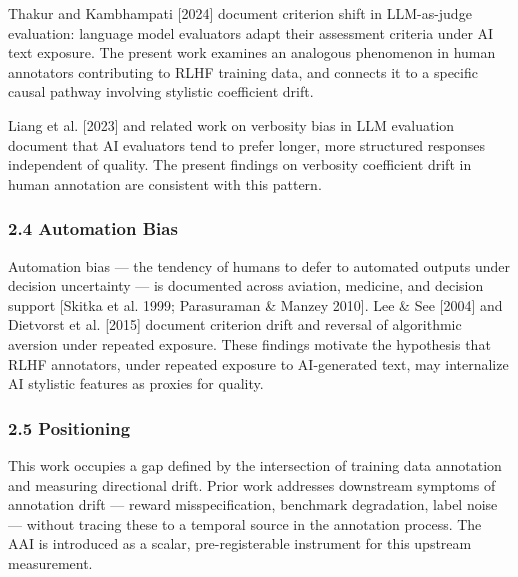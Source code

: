 Thakur and Kambhampati [2024] document criterion shift in LLM-as-judge evaluation: language model evaluators adapt their assessment criteria under AI text exposure. The present work examines an analogous phenomenon in human annotators contributing to RLHF training data, and connects it to a specific causal pathway involving stylistic coefficient drift.

Liang et al. [2023] and related work on verbosity bias in LLM evaluation document that AI evaluators tend to prefer longer, more structured responses independent of quality. The present findings on verbosity coefficient drift in human annotation are consistent with this pattern.

\subsubsection{2.4 Automation Bias}

Automation bias — the tendency of humans to defer to automated outputs under decision uncertainty — is documented across aviation, medicine, and decision support [Skitka et al. 1999; Parasuraman \& Manzey 2010]. Lee \& See [2004] and Dietvorst et al. [2015] document criterion drift and reversal of algorithmic aversion under repeated exposure. These findings motivate the hypothesis that RLHF annotators, under repeated exposure to AI-generated text, may internalize AI stylistic features as proxies for quality.

\subsubsection{2.5 Positioning}

This work occupies a gap defined by the intersection of {training data annotation} and {measuring directional drift}. Prior work addresses downstream symptoms of annotation drift — reward misspecification, benchmark degradation, label noise — without tracing these to a temporal source in the annotation process. The AAI is introduced as a scalar, pre-registerable instrument for this upstream measurement.

